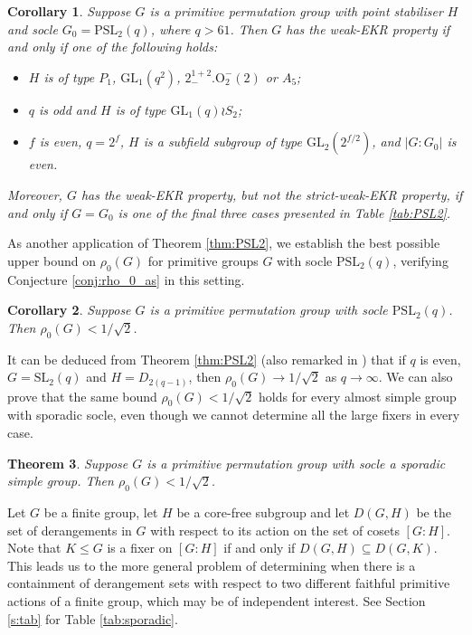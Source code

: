 \documentclass[twoside,a4paper,reqno,11pt]{amsart}
\newcommand{\<}{\langle}
\renewcommand{\>}{\rangle}
\renewcommand{\to}{\rightarrow}
\newcommand{\leqs}{\leqslant}
\newcommand{\PSL}{\mathrm{PSL}}
\newcommand{\GL}{\mathrm{GL}}
\newcommand{\SL}{\mathrm{SL}}
\newtheorem{theorem}{Theorem}
\newtheorem{corol}[theorem]{Corollary}
\theoremstyle{definition}
\begin{document}
	\begin{corol}
		\label{cor:PSL2_weak}
		Suppose $G$ is a primitive permutation group with point stabiliser $H$ and socle $G_0 = \PSL_2(q)$, where $q > 61$. Then $G$ has the weak-EKR property if and only if one of the following holds:
		\begin{itemize}\addtolength{\itemsep}{0.2\baselineskip}
			\item[{\rm (i)}] $H$ is of type $P_1$, $\GL_1(q^2)$, $2^{1+2}_-.\mathrm{O}_2^-(2)$ or $A_5$;
			\item[{\rm (ii)}] $q$ is odd and $H$ is of type $\GL_1(q)\wr S_2$;
			\item[{\rm (iii)}] $f$ is even, $q = 2^f$, $H$ is a subfield subgroup of type $\GL_2(2^{f/2})$, and $|G:G_0|$ is even.
		\end{itemize}
		Moreover, $G$ has the weak-EKR property, but not the strict-weak-EKR property, if and only if $G = G_0$ is one of the final three cases presented in Table \ref{tab:PSL2}.
	\end{corol}
	
	As another application of Theorem \ref{thm:PSL2}, we establish the best possible upper bound on $\rho_0(G)$ for primitive groups $G$ with socle $\PSL_2(q)$, verifying Conjecture \ref{conj:rho_0_as} in this setting.
	
	\begin{corol}
		\label{cor:rho_0_PSL2}
		Suppose $G$ is a primitive permutation group with socle $\PSL_2(q)$. Then $\rho_0(G) < 1/\sqrt{2}$.
	\end{corol}
	
	It can be deduced from Theorem \ref{thm:PSL2} (also remarked in \cite[Lemma 3.1]{LPSX_intersecting}) that if $q$ is even, $G = \SL_2(q)$ and $H = D_{2(q-1)}$, then $\rho_0(G)\to 1/\sqrt{2}$ as $q\to\infty$. We can also prove that the same bound $\rho_0(G) < 1/\sqrt{2}$ holds for every almost simple group with sporadic socle, even though we cannot determine all the large fixers in every case.
	
	\begin{theorem}
		\label{thm:spo_rho_0}
		Suppose $G$ is a primitive permutation group with socle a sporadic simple group. Then $\rho_0(G) < 1/\sqrt{2}$.
	\end{theorem}
	
	Let $G$ be a finite group, let $H$ be a core-free subgroup and let $D(G,H)$ be the set of derangements in $G$ with respect to its action on the set of cosets $[G:H]$. Note that $K\leqs G$ is a fixer on $[G:H]$ if and only if $D(G,H)\subseteq D(G,K)$. This leads us to the more general problem of determining when there is a containment of derangement sets with respect to two different faithful primitive actions of a finite group, which may be of independent interest. See Section \ref{s:tab} for Table \ref{tab:sporadic}.
	
\end{document}
